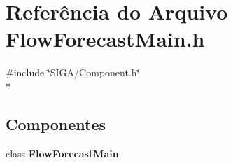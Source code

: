 \section{Referência do Arquivo Flow\+Forecast\+Main.\+h}
\label{_flow_forecast_main_8h}
{\ttfamily \#include \char`\"{}S\+I\+G\+A/\+Component.\+h\char`\"{}}\\*
\subsection*{Componentes}
\begin{DoxyCompactItemize}
\item 
class {\bf Flow\+Forecast\+Main}
\end{DoxyCompactItemize}
